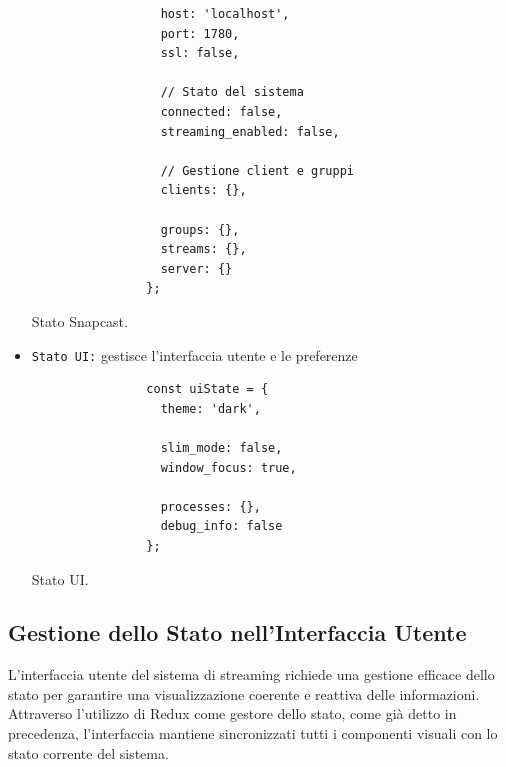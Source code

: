 \begin{itemize}
\begin{table}[H]
\begin{algorithm}[H]
\begin{verbatim}
                  host: 'localhost',
                  port: 1780,
                  ssl: false,
          
                  // Stato del sistema
                  connected: false,
                  streaming_enabled: false,
          
                  // Gestione client e gruppi
                  clients: {},
          
                  groups: {},
                  streams: {},
                  server: {}
                };
              \end{verbatim}
            \end{algorithm}
            \caption{Stato Snapcast.}
            \label{tab:stato_snapcast}
          \end{table}

    \item \texttt{Stato UI:} gestisce l'interfaccia utente e le preferenze

          \begin{table}[H]
            \begin{algorithm}[H]
              \caption{}
              \BlankLine              
              \begin{verbatim}
                const uiState = {
                  theme: 'dark',
          
                  slim_mode: false,
                  window_focus: true,
          
                  processes: {},
                  debug_info: false
                };
              \end{verbatim}
            \end{algorithm}
            \caption{Stato UI.}
            \label{tab:stato_ui}
          \end{table}
\end{itemize}
\newpage
\subsection{Gestione dello Stato nell'Interfaccia Utente}

L'interfaccia utente del sistema di streaming richiede una gestione efficace dello stato per garantire una visualizzazione coerente e reattiva delle informazioni. Attraverso l'utilizzo di Redux come gestore dello stato, come già detto in precedenza, l'interfaccia mantiene sincronizzati tutti i componenti visuali con lo stato corrente del sistema.

